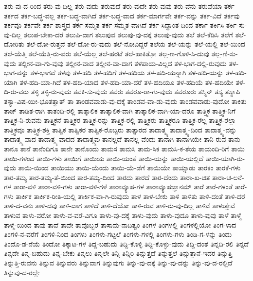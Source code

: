 {ತರು-ವು-ದ-ರಿಂದ
ತರು-ವು-ದಿಲ್ಲ
ತರು-ವುದು
ತರುವುದೆ
ತರು-ವುದೇ
ತರು-ವುವು
ತರು-ವೆನು
ತರುವೆಯಾ
ತರ್ಕ
ತರ್ಕದ
ತರ್ಕ-ಬದ್ಧ-ವಲ್ಲ
ತರ್ಕ-ಬದ್ಧ-ವಾಗಿದೆ
ತರ್ಕ-ಬದ್ಧ-ವಾದ
ತರ್ಕ-ಮಾರ್ಗವೇ
ತರ್ಕ-ವನ್ನು
ತರ್ಕ-ವಿದೆ
ತರ್ಕವು
ತರ್ಕವೂ
ತರ್ಕವೇ
ತರ್ಕ-ಶಾಸ್ತ್ರದ
ತರ್ಕ-ಸಮ್ಮತ
ತರ್ಕ-ಸಮ್ಮತ-ವಾಗಿದೆ
ತರ್ಕ-ಸಿದ್ಧಾಂತ-ದಿಂದ
ತರ್ಕಾ
ತರ್ಕಿಸಿ
ತರ್ಕಿ-ಸು-ವು-ದಿಲ್ಲ
ತಲುಪ-ಬೇಕಾ-ದರೆ
ತಲುಪಿ-ದಾಗ
ತಲುಪುವ
ತಲುಪು-ವು-ದಕ್ಕೆ
ತಲುಪು-ವುದು
ತಲೆ
ತಲೆ-ಕೆಡಿಸಿ
ತಲೆಗೆ
ತಲೆ-ದೋರಿತು
ತಲೆ-ದೋ-ರುತ್ತದೆ
ತಲೆ-ದೋ-ರು-ವುದು
ತಲೆ-ನೋವಿದ್ದರೆ
ತಲೆಯ
ತಲೆ-ಯನ್ನು
ತಲೆ-ಯಲ್ಲಿ
ತಲೆ-ಯಿಂದ
ತಲೆ-ಯೆತ್ತಿ
ತಲೆ-ಯೆತ್ತಿ-ರು-ವರು
ತಲೆ-ಯೆಲ್ಲ
ತಲೆ-ಹರಟೆ
ತಲೆ-ಹಾಕಿತ್ತೋ
ತಲ್ಲ-ಣ-ಗೊಳಿ-ಸಿ-ದುವು
ತಲ್ಲ-ಣಿ-ಸು-ವುದು
ತಲ್ಲೀನ-ವಾ-ಗು-ವುವು
ತಲ್ಲೀನ-ವಾದ
ತಲ್ಲೀನ-ವಾ-ದಾಗ
ತಳಪಾಯ-ವಿಲ್ಲದ
ತಳ-ಭಾಗ-ದಲ್ಲಿ-ರುವುದು
ತಳ-ಭಾಗ-ವನ್ನು
ತಳ-ಭಾಗವೆ
ತಳವು
ತಳ-ಹದಿ
ತಳ-ಹದಿಗೆ
ತಳ-ಹದಿಯ
ತಳ-ಹದಿ-ಯನ್ನಾಗಿ
ತಳ-ಹದಿ-ಯನ್ನು
ತಳ-ಹದಿ-ಯಾಗಿ
ತಳ-ಹದಿ-ಯಾ-ಗಿದೆ
ತಳ-ಹದಿ-ಯಾದ
ತಳ-ಹದಿ-ಯಾ-ದರೆ
ತಳ-ಹದಿಯೂ
ತಳ-ಹದಿಯೆ
ತಳ-ಹದಿಯೇ
ತಳೆ-ದಿ-ರು-ವರು
ತಳ್ಳಿ
ತಳ್ಳಿ-ರು-ವುದು
ತವಕಿ-ಸು-ವುದು
ತವರು
ತವರೂ-ರಾ-ಗು-ವುದು
ತವರೂರು
ತಸ್ಮಿನ್
ತಸ್ಯ
ತಸ್ಯಾಪಿ
ತಸ್ಯಾ-ವಿಷ-ಯೀ-ಭೂತತ್ವಾತ್
ತಾ
ತಾಂಡವವಾಡು-ವು-ದಕ್ಕೆ
ತಾಂಡವ-ವಾ-ಡು-ವುದು
ತಾಂಡವವಾಡು-ವುದೋ
ತಾಕಿತು
ತಾಜ್
ತಾಡಿತ-ರಾಗಿ
ತಾತಂದಿ-ರಲ್ಲಿ
ತಾತ್ಕಾಲಿಕ
ತಾತ್ಕಾಲಿಕ-ವಾಗಿ
ತಾತ್ಕಾಲಿಕ-ವಾಗಿ-ಯಾ-ದರೂ
ತಾತ್ತ್ವಿಕ
ತಾತ್ತ್ವಿಕ-ನಿಗೆ
ತಾತ್ತ್ವಿಕ-ನಿ-ರುವನು
ತಾತ್ತ್ವಿಕನೆ
ತಾತ್ತ್ವಿಕರ
ತಾತ್ತ್ವಿಕ-ರನ್ನು
ತಾತ್ತ್ವಿಕ-ರಲ್ಲಿ
ತಾತ್ತ್ವಿಕರು
ತಾತ್ತ್ವಿಕರೂ
ತಾತ್ತ್ವಿಕ-ರೆಲ್ಲ
ತಾತ್ತ್ವಿಕ-ರೆಲ್ಲಾ
ತಾತ್ತ್ವಿಕವೂ
ತಾತ್ತ್ವಿಕ-ಶಕ್ತಿ
ತಾತ್ವಿಕ
ತಾತ್ವಿಕರ
ತಾತ್ವಿಕ-ರೊಬ್ಬರು
ತಾತ್ಸಾರದ
ತಾದಾತ್ಮ್ಯ
ತಾದಾತ್ಮ್ಯ-ದಿಂದ
ತಾದಾತ್ಮ್ಯ-ವನ್ನು
ತಾದಾತ್ಮ್ಯ-ವಾದ
ತಾದಾತ್ಮ್ಯ-ವಾದದ
ತಾದಾತ್ಮ್ಯವು
ತಾನಲ್ಲದೆ
ತಾನಲ್ಲ-ವೆಂದು
ತಾನಾಗಿ
ತಾನಾಗಿಯೇ
ತಾನಿ-ರುವ
ತಾನು
ತಾನೂ
ತಾನೆ
ತಾನೆಂದಿಗೂ
ತಾನೇ
ತಾನೊಂದು
ತಾಮಸ
ತಾಮಸಿ
ತಾಮ-ಸಿಕ
ತಾಮಸಿ-ಕ-ತೆಯ
ತಾಯಂದಿ-ರಿಗೆ
ತಾಯಿ
ತಾಯಿ-ಗಳಿಂದ
ತಾಯಿ-ಗಳು
ತಾಯಿಗೆ
ತಾಯಿಯ
ತಾಯಿ-ಯಂತೆ
ತಾಯಿ-ಯನ್ನು
ತಾಯಿ-ಯಲ್ಲಿದೆ
ತಾಯಿ-ಯಾಗಿ-ರು-ವುದು
ತಾಯಿ-ಯಿಂದ
ತಾಯಿಯು
ತಾಯಿ-ಯೆಂದು
ತಾಯಿ-ಯೆ-ಡೆಗೆ
ತಾಯಿಯೇ
ತಾಯ್ನಾಡು
ತಾರಕಂ
ತಾರಕೆ-ಗಳು
ತಾರ-ತಮ್ಯ
ತಾರ-ತಮ್ಯ-ತೆ-ಯಿಂದ
ತಾರ-ತಮ್ಯ-ದಿಂದ
ತಾರದು
ತಾರದೆ
ತಾರ-ದೆಂದು
ತಾರಾ-ಖ-ಚಿತ
ತಾರಾ-ಚ-ಲನೆ-ಗಳ
ತಾರಾ-ವಳಿ
ತಾರಾ-ವಳಿ-ಗಳು
ತಾರಾ-ವಳಿ-ಗಳೆ
ತಾರಾವ್ಯೂಹ-ಗಳ
ತಾರಾವ್ಯೂಹಜ್ಞಾನಮ್
ತಾರೆ
ತಾರೆ-ಗಳಂತೆ
ತಾರೆ-ಗಳು
ತಾರ್ಕಿಕ
ತಾರ್ಕಿಕ-ರೀತಿ-ಯಲ್ಲಿ
ತಾರ್ಕಿಕ-ವಾ-ಗಿ-ರುವುದು
ತಾಳ
ತಾಳ-ಬೇಕು
ತಾಳಿ
ತಾಳಿತು
ತಾಳಿ-ದಂತೆ
ತಾಳಿ-ದರೆ
ತಾಳಿ-ದ-ವನು
ತಾಳಿ-ದವು
ತಾಳಿ-ದಾಗ
ತಾಳಿದೆ
ತಾಳಿ-ದೆಯೋ
ತಾಳಿ-ರುವ
ತಾಳಿ-ರು-ವು-ದಿಲ್ಲ
ತಾಳಿವೆ
ತಾಳುತ್ತೇವೆ
ತಾಳುವ
ತಾಳು-ವರೋ
ತಾಳು-ವ-ವರೆ-ವಿಗೂ
ತಾಳು-ವು-ದಕ್ಕೆ
ತಾಳು-ವುದು
ತಾಳು-ವುದೂ
ತಾಳು-ವುವು
ತಾಳೆ
ತಾಳ್ಮೆ
ತಾಳ್ಮೆ-ಯಿಂದ
ತಾವು
ತಾವೆ
ತಾವೇ
ತಾವೊಬ್ಬರೆ
ತಾಸಾಮ-ನಾದಿತ್ವಂ
ತಿಂಗಳ
ತಿಂಗಳಲ್ಲಿ
ತಿಂಗಳಲ್ಲಿಯೋ
ತಿಂಗ-ಳಾದ
ತಿಂಗಳಿ-ನ-ವರೆಗೆ
ತಿಂಗಳಿ-ನಿಂದ
ತಿಂಗಳು
ತಿಂಗಳು-ಗಟ್ಟಲೆ
ತಿಂಗಳು-ಗಳಲ್ಲಿ
ತಿಂಗಳು-ಗಳು
ತಿಂಡಿ-ಗ-ಳನ್ನು
ತಿಂದು
ತಿಂದೊ-ಡ-ನೆಯೆ
ತಿಂದೋ
ತಿಕ್ಕಾಟ-ಗಳ
ತಿದ್ದ-ಬಹುದು
ತಿದ್ದಿ-ಕೊಳ್ಳಿ
ತಿದ್ದಿ-ಕೊಳ್ಳು-ವುದು
ತಿದ್ದಿ-ದಂತೆ
ತಿನ್ನದಿ-ರಲಿ
ತಿನ್ನದೆ
ತಿನ್ನದೇ
ತಿನ್ನ-ಬಹುದು
ತಿನ್ನ-ಬೇಕು
ತಿನ್ನಲು
ತಿನ್ನಲೇ
ತಿನ್ನಿ
ತಿನ್ನಿರಿ
ತಿನ್ನುತ್ತದೆ
ತಿನ್ನುತ್ತಲೆ
ತಿನ್ನುತ್ತಾನೆ-ಇದರ
ತಿನ್ನುತ್ತಿ
ತಿನ್ನುತ್ತಿ-ರುವನು
ತಿನ್ನುವ
ತಿನ್ನುವರು
ತಿನ್ನುವಾಗ
ತಿನ್ನುವುಗು
ತಿನ್ನು-ವು-ದಕ್ಕೆ
ತಿನ್ನು-ವು-ದನ್ನು
ತಿನ್ನು-ವು-ದ-ರಲ್ಲಿದೆ
ತಿನ್ನುವು-ದ-ರಲ್ಲೇ
}
